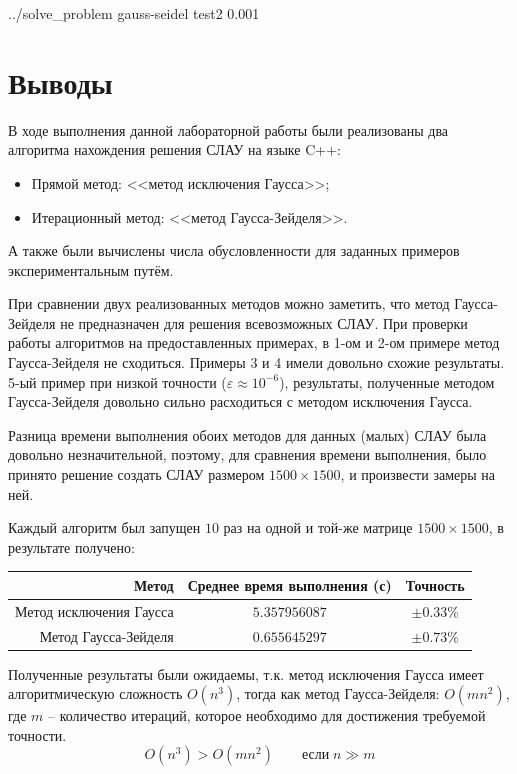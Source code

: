 \documentclass[a4paper]{article}
\begin{document}
\bash[stdout]
../solve_problem gauss-seidel test2 0.001
\END

\section{Выводы}
В ходе выполнения данной лабораторной работы были реализованы два алгоритма нахождения решения СЛАУ на языке C++:
\begin{itemize}
    \item Прямой метод: <<метод исключения Гаусса>>;
    \item Итерационный метод: <<метод Гаусса-Зейделя>>.
\end{itemize}
А также были вычислены числа обусловленности для заданных примеров экспериментальным путём.

\bigskip

При сравнении двух реализованных методов можно заметить, что метод Гаусса-Зейделя не предназначен для решения всевозможных СЛАУ.
При проверки работы алгоритмов на предоставленных примерах, в 1-ом и 2-ом примере метод Гаусса-Зейделя не сходиться. Примеры 3 и 4 имели довольно схожие результаты.
5-ый пример при низкой точности ($\varepsilon \approx 10^{-6}$), результаты, полученные методом Гаусса-Зейделя довольно сильно расходиться с методом исключения Гаусса. 

\bigskip

Разница времени выполнения обоих методов для данных (малых) СЛАУ была довольно незначительной, поэтому, для сравнения времени выполнения, было принято решение создать СЛАУ размером $1500 \times 1500$, и произвести замеры на ней.

Каждый алгоритм был запущен $10$ раз на одной и той-же матрице $1500 \times 1500$, в результате получено:
\begin{center}
    \begin{tabular}{r|cc}
        Метод & Среднее время выполнения (с) & Точность \\
        \hline
        Метод исключения Гаусса & $5.357956087$ & $\pm 0.33\%$ \\
        Метод Гаусса-Зейделя    & $0.655645297$ & $\pm 0.73\%$ \\
    \end{tabular}
\end{center}

Полученные результаты были ожидаемы, т.к. метод исключения Гаусса имеет алгоритмическую сложность $O(n^3)$, тогда как метод Гаусса-Зейделя: $O(mn^2)$, где $m$ -- количество итераций, которое необходимо для достижения требуемой точности.
\begin{equation*}
    O(n^3) > O(mn^2) \qquad \text{если} \; n \gg m
\end{equation*}
\end{document}
